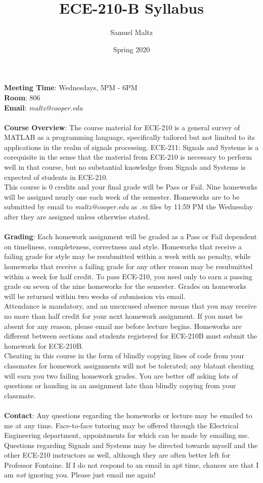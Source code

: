 \documentclass[11pt]{article}
\title{ECE-210-B Syllabus}
\author{Samuel Maltz}
\date{Spring 2020}
\begin{document}
\noindent\textbf{Meeting Time}: Wednesdays, 5PM - 6PM \\
\textbf{Room}: 806 \\
\textbf{Email}: \textit{maltz@cooper.edu} \\ \\
\textbf{Course Overview}: The course material for ECE-210 is a general survey of MATLAB as a programming language, specifically tailored but not limited to its applications in the realm of signals processing. ECE-211: Signals and Systems is a corequisite in the sense that the material from ECE-210 is necessary to perform well in that course, but no substantial knowledge from Signals and Systems is expected of students in ECE-210. \\
This course is 0 credits and your final grade will be Pass or Fail. Nine homeworks will be assigned nearly one each week of the semester. Homeworks are to be submitted by email to \textit{maltz@cooper.edu} as \textit{.m} files by 11:59 PM the Wednesday after they are assigned unless otherwise stated. \\ \\
\textbf{Grading}: Each homework assignment will be graded as a Pass or Fail dependent on timeliness, completeness, correctness and style. Homeworks that receive a failing grade for style may be resubmitted within a week with no penalty, while homeworks that receive a failing grade for any other reason may be resubmitted within a week for half credit. To pass ECE-210, you need only to earn a passing grade on seven of the nine homeworks for the semester. Grades on homeworks will be returned within two weeks of submission via email.\\
Attendance is mandatory, and an unexcused absence means that you may receive no more than half credit for your next homework assignment. If you must be absent for any reason, please email me before lecture begins. Homeworks are different between sections and students registered for ECE-210B must submit the homework for ECE-210B.\\ 
Cheating in this course in the form of blindly copying lines of code from your classmates for homework assignments will not be tolerated; any blatant cheating will earn you two failing homework grades. You are better off asking lots of questions or handing in an assignment late than blindly copying from your classmate. \\ \\
\textbf{Contact}: Any questions regarding the homeworks or lecture may be emailed to me at any time. Face-to-face tutoring may be offered through the Electrical Engineering department, appointments for which can be made by emailing me. Questions regarding Signals and Systems may be directed towards myself and the other ECE-210 instructors as well, although they are often better left for Professor Fontaine. If I do not respond to an email in apt time, chances are that I am \textit{not} ignoring you. Please just email me again! \\
\end{document}
